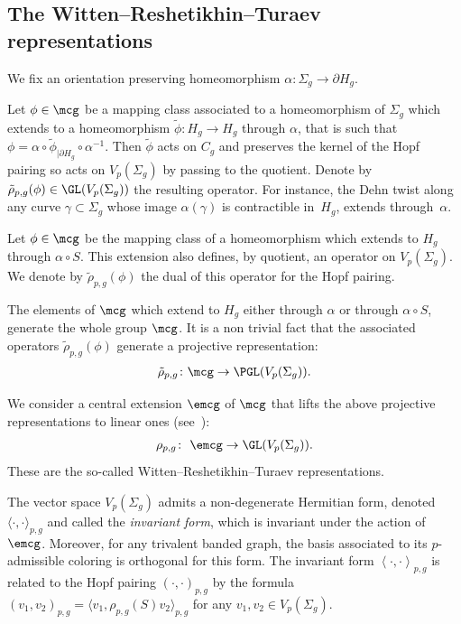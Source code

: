 \subsection{The Witten--Reshetikhin--Turaev representations}\label{section2.2}

We fix an orientation preserving homeomorphism $\alpha\colon \Sigma_g \rightarrow \partial H_g$.

Let $\phi \in \mcg$ be a mapping class associated to a homeomorphism of $\Sigma_g$ which extends to a homeomorphism $\widetilde{\phi}\colon H_g\rightarrow H_g$ through $\alpha$, that is such that $\phi=\alpha\circ \widetilde{\phi}_{| \partial H_g}\circ \alpha^{-1}$. Then $\widetilde{\phi}$ acts on $C_g$ and preserves the kernel of the Hopf pairing so acts on $V_{p}(\Sigma_g)$ by passing to the quotient. Denote by $\tilde{\rho}_{p,g}(\phi) \in \GL(V_{p}(\Sigma_g))$ the resulting operator. For instance, the Dehn twist along any curve $\gamma\subset \Sigma_g$ whose image $\alpha(\gamma)$ is contractible in~$H_g$, extends through~$\alpha$.

Let $\phi\in \mcg$ be the mapping class of a homeomorphism which extends to $H_g$ through $\alpha\circ S$. This extension also defines, by quotient, an operator on $V_{p}(\Sigma_g)$. We denote by $\tilde{\rho}_{p,g}(\phi)$ the dual of this operator for the Hopf pairing.

The elements of $\mcg$ which extend to $H_g$ either through $\alpha$ or through $\alpha\circ S$, generate the whole group $\mcg$. It is a non trivial fact that the associated operators $\tilde{\rho}_{p,g}(\phi)$ generate a projective representation:
\begin{gather*} \tilde{\rho}_{p,g} \colon \mcg \rightarrow \PGL(V_{p}(\Sigma_g)).\end{gather*}

We consider a central extension $\emcg$ of $\mcg$ that lifts the above projective representations to linear ones (see~\cite{GM13, MR}):
\begin{gather*} \rho_{p,g} \colon \ \emcg \rightarrow \GL(V_{p}(\Sigma_g)).\end{gather*}
These are the so-called Witten--Reshetikhin--Turaev representations.

The vector space $V_p(\Sigma_g)$ admits a non-degenerate Hermitian form, denoted $\langle \cdot, \cdot\rangle_{p,g}$ and called the \textit{invariant form}, which is invariant under the action of~$\emcg$. Moreover, for any trivalent banded graph, the basis associated to its $p$-admissible coloring is orthogonal for this form. The invariant form $\left<\cdot, \cdot\right>_{p,g}$ is related to the Hopf pairing $ (\cdot, \cdot )_{p,g}$ by the formula $ (v_1, v_2 )_{p,g}= \langle v_1, \rho_{p,g}(S)v_2\rangle _{p,g}$ for any $v_1,v_2\in V_p(\Sigma_g)$.


